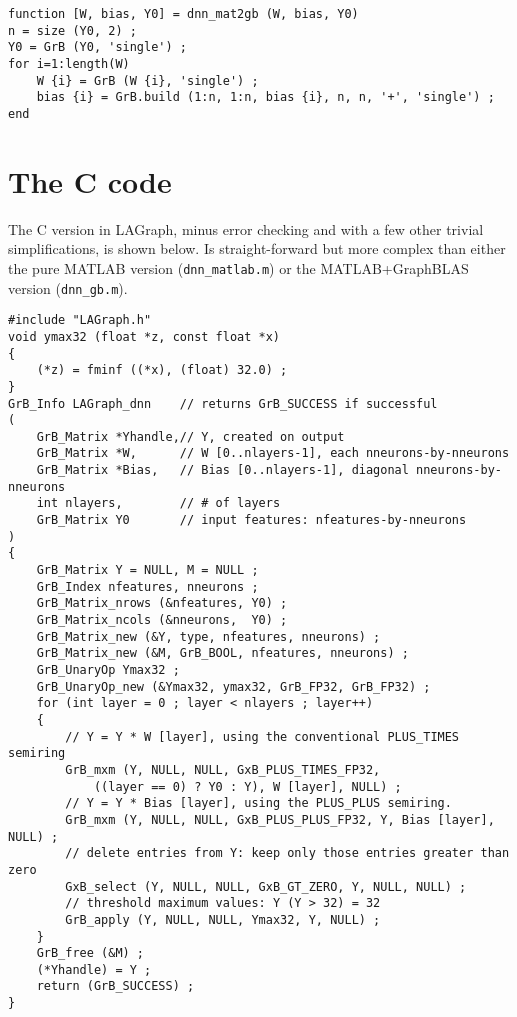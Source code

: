 \documentclass[12pt]{article}
\begin{document}
{\footnotesize
\begin{verbatim}
function [W, bias, Y0] = dnn_mat2gb (W, bias, Y0)
n = size (Y0, 2) ;
Y0 = GrB (Y0, 'single') ;
for i=1:length(W)
    W {i} = GrB (W {i}, 'single') ;
    bias {i} = GrB.build (1:n, 1:n, bias {i}, n, n, '+', 'single') ;
end
\end{verbatim}}


\newpage

\section{The C code}

The C version in LAGraph, minus error checking and with a
few other trivial simplifications, is shown below.  Is straight-forward
but more complex than either the pure MATLAB version (\verb'dnn_matlab.m')
or the MATLAB+GraphBLAS version (\verb'dnn_gb.m').

{\footnotesize
\begin{verbatim}
#include "LAGraph.h"
void ymax32 (float *z, const float *x)
{
    (*z) = fminf ((*x), (float) 32.0) ;
}
GrB_Info LAGraph_dnn    // returns GrB_SUCCESS if successful
(
    GrB_Matrix *Yhandle,// Y, created on output
    GrB_Matrix *W,      // W [0..nlayers-1], each nneurons-by-nneurons
    GrB_Matrix *Bias,   // Bias [0..nlayers-1], diagonal nneurons-by-nneurons
    int nlayers,        // # of layers
    GrB_Matrix Y0       // input features: nfeatures-by-nneurons
)
{
    GrB_Matrix Y = NULL, M = NULL ;
    GrB_Index nfeatures, nneurons ;
    GrB_Matrix_nrows (&nfeatures, Y0) ;
    GrB_Matrix_ncols (&nneurons,  Y0) ;
    GrB_Matrix_new (&Y, type, nfeatures, nneurons) ;
    GrB_Matrix_new (&M, GrB_BOOL, nfeatures, nneurons) ;
    GrB_UnaryOp Ymax32 ;
    GrB_UnaryOp_new (&Ymax32, ymax32, GrB_FP32, GrB_FP32) ;
    for (int layer = 0 ; layer < nlayers ; layer++)
    {
        // Y = Y * W [layer], using the conventional PLUS_TIMES semiring
        GrB_mxm (Y, NULL, NULL, GxB_PLUS_TIMES_FP32,
            ((layer == 0) ? Y0 : Y), W [layer], NULL) ;
        // Y = Y * Bias [layer], using the PLUS_PLUS semiring.
        GrB_mxm (Y, NULL, NULL, GxB_PLUS_PLUS_FP32, Y, Bias [layer], NULL) ;
        // delete entries from Y: keep only those entries greater than zero
        GxB_select (Y, NULL, NULL, GxB_GT_ZERO, Y, NULL, NULL) ;
        // threshold maximum values: Y (Y > 32) = 32
        GrB_apply (Y, NULL, NULL, Ymax32, Y, NULL) ;
    }
    GrB_free (&M) ;
    (*Yhandle) = Y ;
    return (GrB_SUCCESS) ;
} \end{verbatim}}
\end{document}
